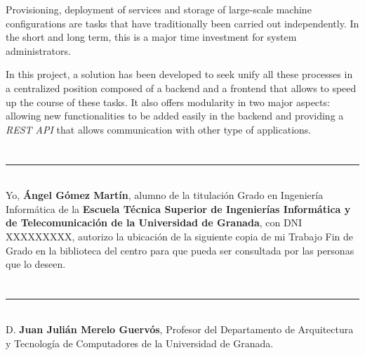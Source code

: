 Provisioning, deployment of services and storage of large-scale machine configurations are tasks that have traditionally been carried out independently. In the short and long term, this is a major time investment for system administrators.

\bigskip
In this project, a solution has been developed to seek unify all these processes in a centralized position composed of a backend and a frontend that allows to speed up the course of these tasks. It also offers modularity in two major aspects: allowing new functionalities to be added easily in the backend and providing a \textit{REST API} that allows communication with other type of applications.











\chapter*{}
\thispagestyle{empty}

\noindent\rule[-1ex]{\textwidth}{2pt}\\[4.5ex]

Yo, \textbf{Ángel Gómez Martín}, alumno de la titulación Grado en Ingeniería Informática de la \textbf{Escuela Técnica Superior de Ingenierías Informática y de Telecomunicación de la Universidad de Granada}, con DNI XXXXXXXXX, autorizo la ubicación de la siguiente copia de mi Trabajo Fin de Grado en la biblioteca del centro para que pueda ser consultada por las personas que lo deseen.

\vspace{6cm}


\vspace{2cm}












\chapter*{}
\thispagestyle{empty}

\noindent\rule[-1ex]{\textwidth}{2pt}\\[4.5ex]

D. \textbf{Juan Julián Merelo Guervós}, Profesor del Departamento de Arquitectura y Tecnología de Computadores de la Universidad de Granada.

